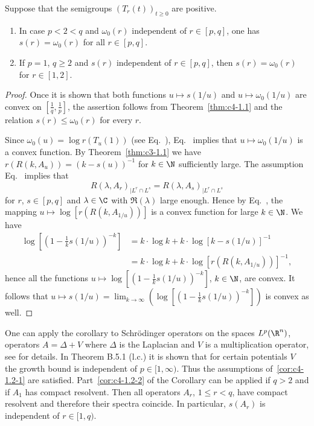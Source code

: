 \begin{corollary}\label{cor:c4-1.2}
Suppose that the semigroups $(T_{r}(t))_{t\geq 0}$ are positive.
\begin{enumerate}[\upshape(i)]
\item \label{cor:c4-1.2-1}
In case $p < 2 < q$ and $\omega_{0}(r)$ independent of\/ $r \in [p,q]$, one has $s(r) = \omega_{0}(r)$ for all $r \in [p,q]$.
\item \label{cor:c4-1.2-2}
If\/ $p = 1$, $q \geq 2$ and $s(r)$ independent of\/ $r \in [p,q]$, then $s(r) = \omega_{0}(r)$ for $r \in [1,2]$.
\end{enumerate}
\end{corollary}
\begin{proof}
Once it is shown that both functions $u \mapsto s(1/u)$ and $u \mapsto \omega_{0}(1/u)$ are convex on $[\frac{1}{q},\frac{1}{p}]$, the assertion follows from  Theorem~\ref{thm:c4-1.1} and the relation $s(r) \leq \omega_{0}(r)$ for every $r$.

Since $\omega_{0}(u) = \log r(T_{u}(1))$ (see Eq.~), Eq.~ implies that $u \mapsto \omega_0(1/u)$ is a convex function.
By Theorem~\ref{thm:c3-1.1} we have $r(R(k,A_{u})) = (k-s(u))^{-1}$ for $k \in \N$ sufficiently large.
The assumption Eq.~ implies that 
\[
R(\lambda,A_{r})_{|L^{r} \cap L^{s}} = R(\lambda,A_{s})_{|L^{r} \cap L^{s}}
\]
for $r$, $s \in [p,q]$ and $\lambda \in \C$ with $\Re(\lambda)$ large enough.
Hence by Eq.~, the mapping  $u \mapsto \log [r(R(k,A_{1/u}))]$ is a convex function for large $k \in \N$.
We have
\begin{align*}
\log  \left[(1 - \frac{1}{k}s(1/u))^{-k}\right] &= k \cdot \log k + k \cdot \log [k - s(1/u)]^{-1} \\
&= k \cdot \log k + k \cdot \log [r(R(k,A_{1/u}))]^{-1},
\end{align*}
hence all the functions $u \mapsto \log[(1 - \frac{1}{k}s(1/u))^{-k}]$, $k \in \N$, are convex.
It follows that $u \mapsto s(1/u) = \lim_{k\to\infty}(\log [(1 - \frac{1}{k}s(1/u))^{-k}])$ is convex as well.
\end{proof}
One can apply the corollary to Schrödinger operators on the spaces $L^{p}(\R^{n})$, \ie operators $A = \Delta + V$ where $\Delta$ is the Laplacian and $V$ is a multiplication operator, see  \textcite{simon:1982} for details.
In Theorem B.5.1 (l.c.) it is shown that for certain potentials $V$ the growth bound is independent of\/ $p \in [1,\infty)$.
Thus the assumptions of~\ref{cor:c4-1.2-1} are satisfied.
Part~\ref{cor:c4-1.2-2} of the Corollary can be applied if\/ $q > 2$ and if\/ $A_{1}$ has compact resolvent.
Then all operators $A_{r}$, $1 \leq r < q$, have compact resolvent and therefore their spectra coincide.
In particular, $s(A_{r})$ is independent of\/ $r \in [1,q)$.

